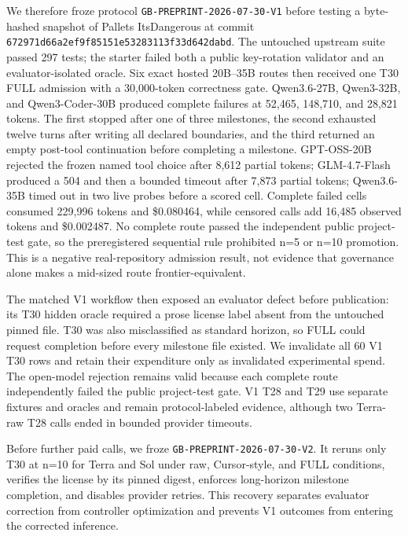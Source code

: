 \documentclass[10pt,twocolumn]{article}
\begin{document}
We therefore froze protocol
\texttt{GB-PREPRINT-2026-07-30-V1} before testing a byte-hashed snapshot of
Pallets ItsDangerous at commit
\texttt{672971d66a2ef9f85151e53283113f33d642dabd}. The untouched upstream suite
passed 297 tests; the starter failed both a public key-rotation validator and
an evaluator-isolated oracle. Six exact hosted 20B--35B routes then received
one T30 FULL admission with a 30,000-token correctness gate. Qwen3.6-27B,
Qwen3-32B, and Qwen3-Coder-30B produced complete failures at 52,465, 148,710,
and 28,821 tokens. The first stopped after one of three milestones, the second
exhausted twelve turns after writing all declared boundaries, and the third
returned an empty post-tool continuation before completing a milestone.
GPT-OSS-20B rejected the frozen named tool choice after 8,612 partial tokens;
GLM-4.7-Flash produced a 504 and then a bounded timeout after 7,873 partial
tokens; Qwen3.6-35B timed out in two live probes before a scored cell. Complete
failed cells consumed 229,996 tokens and \$0.080464, while censored calls add
16,485 observed tokens and \$0.002487. No complete route passed the independent
public project-test gate, so the preregistered sequential rule prohibited n=5
or n=10 promotion. This is a negative real-repository admission result, not
evidence that governance alone makes a mid-sized route frontier-equivalent.

The matched V1 workflow then exposed an evaluator defect before publication:
its T30 hidden oracle required a prose license label absent from the untouched
pinned file. T30 was also misclassified as standard horizon, so FULL could
request completion before every milestone file existed. We invalidate all 60
V1 T30 rows and retain their expenditure only as invalidated experimental
spend. The open-model rejection remains valid because each complete route
independently failed the public project-test gate. V1 T28 and T29 use separate
fixtures and oracles and remain protocol-labeled evidence, although two
Terra-raw T28 calls ended in bounded provider timeouts.

Before further paid calls, we froze
\texttt{GB-PREPRINT-2026-07-30-V2}. It reruns only T30 at n=10 for Terra and
Sol under raw, Cursor-style, and FULL conditions, verifies the license by its
pinned digest, enforces long-horizon milestone completion, and disables
provider retries. This recovery separates evaluator correction from controller
optimization and prevents V1 outcomes from entering the corrected inference.
\end{document}
